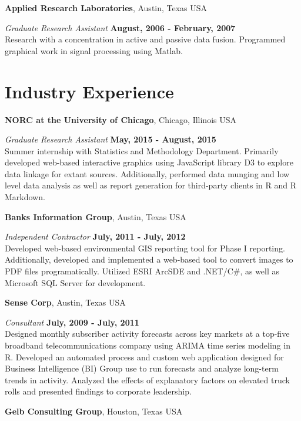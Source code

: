 \documentclass[margin,line]{res}
\begin{document}
\begin{resume}
\vspace{-.1cm}
{\bf Applied Research Laboratories}, Austin, Texas USA

\vspace{-.3cm}
{\em Graduate Research Assistant} \hfill {\bf August, 2006 - February, 2007}\\
Research with a concentration in active and passive data fusion. Programmed graphical work in signal processing using Matlab.

\section{\sc Industry Experience}
{\bf NORC at the University of Chicago}, Chicago, Illinois USA

\vspace{-.3cm}
{\em Graduate Research Assistant} \hfill {\bf May, 2015 - August, 2015}\\
Summer internship with Statistics and Methodology Department. Primarily developed web-based interactive graphics using JavaScript library D3 to explore data linkage for extant sources. Additionally, performed data munging and low level data analysis as well as report generation for third-party clients in R and R Markdown.

{\bf Banks Information Group}, Austin, Texas USA

\vspace{-.3cm}
{\em Independent Contractor} \hfill {\bf July, 2011 - July, 2012}\\
Developed web-based environmental GIS reporting tool for Phase I reporting. Additionally, developed and implemented a web-based tool to convert images to PDF files programatically.  Utilized ESRI ArcSDE and .NET/C\#, as well as Microsoft SQL Server for development.

{\bf Sense Corp}, Austin, Texas USA

\vspace{-.3cm}
{\em Consultant} \hfill {\bf July, 2009 - July, 2011}\\
Designed monthly subscriber activity forecasts across key markets at a top-five broadband telecommunications company using ARIMA time series modeling in R. Developed an automated process and custom web application designed for Business Intelligence (BI) Group use to run forecasts and analyze long-term trends in activity. Analyzed the effects of explanatory factors on elevated truck rolls and presented findings to corporate leadership.

{\bf Gelb Consulting Group}, Houston, Texas USA


\end{resume}
\end{document}
